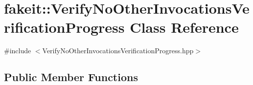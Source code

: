 \hypertarget{classfakeit_1_1VerifyNoOtherInvocationsVerificationProgress}{}\section{fakeit\+::Verify\+No\+Other\+Invocations\+Verification\+Progress Class Reference}
\label{classfakeit_1_1VerifyNoOtherInvocationsVerificationProgress}


{\ttfamily \#include $<$Verify\+No\+Other\+Invocations\+Verification\+Progress.\+hpp$>$}

\subsection*{Public Member Functions}
